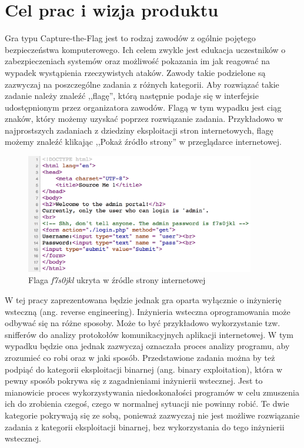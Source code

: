 \documentclass[language=polish,type=eng]{aghmodern}
\author{Piotr Szczygieł}
\date{2021}
\begin{document}
\frontmatter
\maketitle
\tableofcontents

\mainmatter

\chapter{Cel prac i wizja produktu}

Gra typu Capture-the-Flag jest to rodzaj zawodów z ogólnie pojętego
bezpieczeństwa komputerowego. Ich celem zwykle jest edukacja uczestników
o zabezpieczeniach systemów oraz możliwość pokazania im jak reagować
na wypadek wystąpienia rzeczywistych ataków. Zawody takie podzielone są zazwyczaj
na poszczególne zadania z różnych kategorii. Aby rozwiązać takie zadanie należy
znaleźć ,,flagę'', którą następnie podaje się w interfejsie udostępnionym przez
organizatora zawodów. Flagą w tym wypadku jest ciąg znaków, który możemy uzyskać
poprzez rozwiązanie zadania. Przykładowo w najprostszych zadaniach
z dziedziny eksploitacji stron internetowych, flagę możemy znaleźć klikając
,,Pokaż źródło strony'' w przeglądarce internetowej.

\begin{figure}[H]
\centering
\includegraphics[width=10cm]{flag_page_source}
\caption{Flaga \emph{f7s0jkl} ukryta w źródle strony internetowej}
\end{figure}

W tej pracy zaprezentowana będzie jednak gra oparta
wyłącznie o inżynierię wsteczną (ang. reverse engineering).
Inżynieria wsteczna oprogramowania może odbywać się na różne sposoby.
Może to być przykładowo wykorzystanie tzw. snifferów do analizy protokołów
komunikacyjnych aplikacji internetowej. W tym wypadku będzie ona jednak
zazwyczaj oznaczała proces analizy programu, aby zrozumieć co robi
oraz w jaki sposób. Przedstawione zadania można by też podpiąć do kategorii
eksploitacji binarnej (ang. binary exploitation), która w pewny sposób pokrywa
się z zagadnieniami inżynierii wstecznej. Jest to mianowicie proces
wykorzystywania niedoskonałości programów w celu zmuszenia ich do zrobienia
czegoś, czego w normalnej sytuacji nie powinny robić. Te dwie kategorie pokrywają
się ze sobą, ponieważ zazwyczaj nie jest możliwe rozwiązanie zadania z kategorii
eksploitacji binarnej, bez wykorzystania do tego inżynierii wstecznej.
\end{document}
